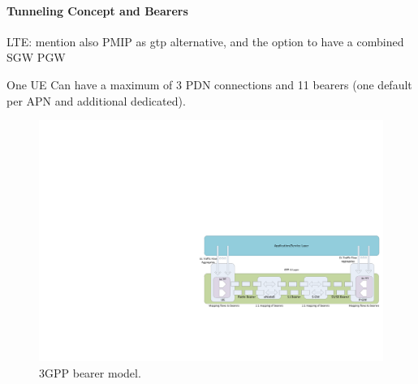 




\paragraph{Tunneling Concept and Bearers}

LTE: mention also \gls{PMIP} as \gls{gtp} alternative, and the option to have a combined \gls{SGW} \gls{PGW}


One UE Can have a maximum of 3 \gls{PDN} connections and 11 bearers (one default per \gls{APN} and additional dedicated).


\begin{figure}[htb]
	\centering
	\includegraphics[width=1.0\textwidth]{images/bearers.pdf}
	\caption{3GPP bearer model.}
	\label{c4:fig:3gpp-bearers}
\end{figure}



